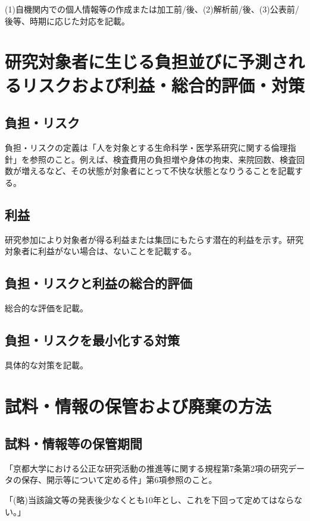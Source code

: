 \documentclass{kyodai-protocol}
\begin{document}
(1)自機関内での個人情報等の作成または加工前/後、(2)解析前/後、(3)公表前/後等、時期に応じた対応を記載。

\section{研究対象者に生じる負担並びに予測されるリスクおよび利益・総合的評価・対策}
\label{sec:risk-benefit}

\subsection{負担・リスク}

負担・リスクの定義は「人を対象とする生命科学・医学系研究に関する倫理指針」を参照のこと。例えば、検査費用の負担増や身体の拘束、来院回数、検査回数が増えるなど、その状態が対象者にとって不快な状態となりうることを記載する。

\subsection{利益}

研究参加により対象者が得る利益または集団にもたらす潜在的利益を示す。研究対象者に利益がない場合は、ないことを記載する。

\subsection{負担・リスクと利益の総合的評価}

総合的な評価を記載。

\subsection{負担・リスクを最小化する対策}

具体的な対策を記載。

\section{試料・情報の保管および廃棄の方法}
\label{sec:storage}

\subsection{試料・情報等の保管期間}

「京都大学における公正な研究活動の推進等に関する規程第7条第2項の研究データの保存、開示等について定める件」第6項参照のこと。

「(略)当該論文等の発表後少なくとも10年とし、これを下回って定めてはならない。」
\end{document}
